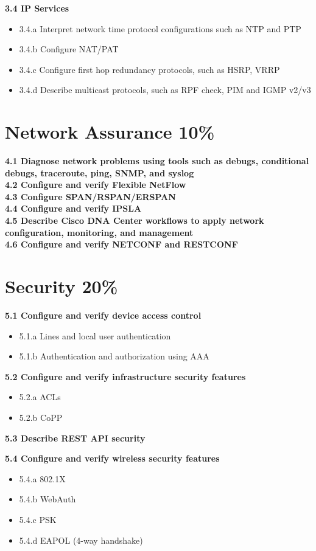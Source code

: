 \documentclass{article}
\begin{document}
\noindent\textbf{3.4 IP Services}
\begin{itemize}
\item 3.4.a Interpret network time protocol configurations such as NTP and PTP
\item 3.4.b Configure NAT/PAT
\item 3.4.c Configure first hop redundancy protocols, such as HSRP, VRRP
\item 3.4.d Describe multicast protocols, such as RPF check, PIM and IGMP v2/v3
\end{itemize}

\newpage
\section{Network Assurance 10\%}
\noindent\textbf{4.1 Diagnose network problems using tools such as debugs, conditional debugs, traceroute, ping, SNMP, and syslog}\\
\noindent\textbf{4.2 Configure and verify Flexible NetFlow}\\
\noindent\textbf{4.3 Configure SPAN/RSPAN/ERSPAN}\\
\noindent\textbf{4.4 Configure and verify IPSLA}\\
\noindent\textbf{4.5 Describe Cisco DNA Center workflows to apply network configuration, monitoring, and management}\\
\noindent\textbf{4.6 Configure and verify NETCONF and RESTCONF}\\

\newpage
\section{Security 20\%}
\noindent\textbf{5.1 Configure and verify device access control}
\begin{itemize}
\item 5.1.a Lines and local user authentication
\item 5.1.b Authentication and authorization using AAA
\end{itemize}

\noindent\textbf{5.2 Configure and verify infrastructure security features}
\begin{itemize}
\item 5.2.a ACLs
\item 5.2.b CoPP
\end{itemize}

\noindent\textbf{5.3 Describe REST API security}

\noindent\textbf{5.4 Configure and verify wireless security features}
\begin{itemize}
\item 5.4.a 802.1X
\item 5.4.b WebAuth
\item 5.4.c PSK
\item 5.4.d EAPOL (4-way handshake)
\end{itemize}
\end{document}
